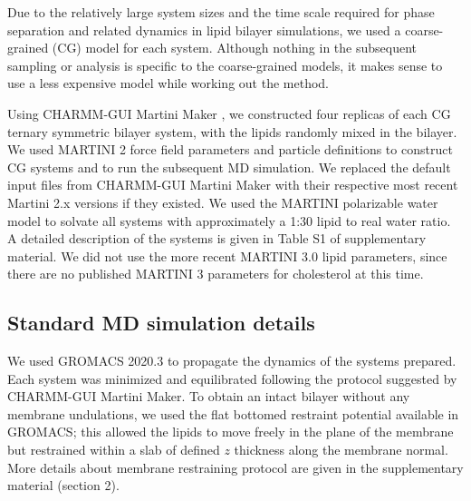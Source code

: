 \documentclass{biophys-new}
\begin{document}
Due to the relatively large system sizes and the time scale required for phase separation and related dynamics in lipid bilayer simulations, we used a coarse-grained (CG) model for each system. Although nothing in the subsequent sampling or analysis is specific to the coarse-grained models, it makes sense to use a less expensive model while working out the method.
 
Using CHARMM-GUI Martini Maker \cite{Qi2015}, we constructed four replicas of each CG ternary symmetric bilayer system, with the lipids randomly mixed in the bilayer.
We used MARTINI 2 force field parameters and particle definitions\cite{Marrink2007, DeJong2013} to construct CG systems and to run the subsequent MD simulation.
We replaced the default input files from CHARMM-GUI Martini Maker with their respective most recent Martini 2.x versions if they existed.
We used the MARTINI polarizable water model\cite{Yesylevskyy2010} to solvate all systems with approximately a 1:30 lipid to real water ratio.
A detailed description of the systems is given in Table S1 of supplementary material.
We did not use the more recent MARTINI 3.0 lipid parameters, since there are no published MARTINI 3 parameters for cholesterol at this time.

\subsection*{Standard MD simulation details}

We used GROMACS 2020.3\cite{Abraham2015} to propagate the dynamics of the systems prepared. 
Each system was minimized and equilibrated following the protocol suggested by CHARMM-GUI Martini Maker.
To obtain an intact bilayer without any membrane undulations, we used  
the flat bottomed restraint potential available in GROMACS; this allowed the lipids to move freely in the plane of the membrane but restrained within a slab of defined $z$ thickness along the membrane normal.  
More details about membrane restraining protocol are given in the supplementary material (section 2).
\end{document}
